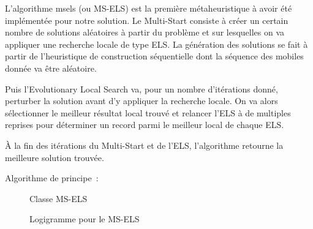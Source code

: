 			L'algorithme \acrlong{msels} (ou MS-ELS) est la première métaheuristique à avoir été implémentée pour notre solution. Le Multi-Start consiste à créer un certain nombre de solutions aléatoires à partir du problème et sur lesquelles on va appliquer une recherche locale de type ELS. La génération des solutions se fait à partir de l'heuristique de construction séquentielle dont la séquence des mobiles donnée va être aléatoire.

			Puis l'Evolutionary Local Search va, pour un nombre d'itérations donné, perturber la solution avant d'y appliquer la recherche locale. On va alors sélectionner le meilleur résultat local trouvé et relancer l'ELS à de multiples reprises pour déterminer un record parmi le meilleur local de chaque ELS.

			À la fin des itérations du Multi-Start et de l'ELS, l'algorithme retourne la meilleure solution trouvée.

			Algorithme de principe :
			\begin{code}
				\begin{algo}[informal]
					\BEGIN
									\ENDIF
								\ENDFOR
								\ENDIF
							\ENDFOR
						\ENDFOR
					\END
				\end{algo}
			\end{code}

			\begin{figure}[H]
			
				\centering
				\begin{tikzpicture}
					
				\end{tikzpicture}
				\caption[UML -- Métaheuristique MS-ELS]{Classe MS-ELS}
				\label{uml:ms-els}
			\end{figure}

			\begin{figure}[H]
				\centering
				\begin{tikzpicture}[node distance=1cm]
					
				\end{tikzpicture}
				\caption{Logigramme pour le MS-ELS}
				\label{fig:ms-els-logigram}
			\end{figure}

